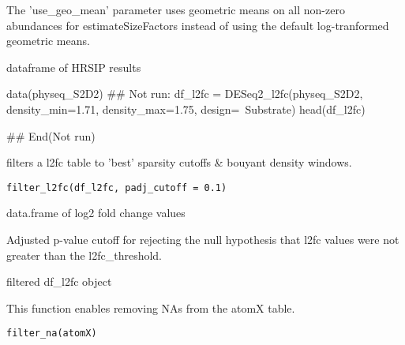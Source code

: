 \documentclass[a4paper]{book}
\begin{document}
%
\begin{Details}\relax
The 'use\_geo\_mean' parameter uses geometric means on all non-zero abundances
for estimateSizeFactors instead of using the default log-tranformed geometric means.
\end{Details}
%
\begin{Value}
dataframe of HRSIP results
\end{Value}
%
\begin{Examples}
\begin{ExampleCode}
data(physeq_S2D2)
## Not run: 
df_l2fc = DESeq2_l2fc(physeq_S2D2, density_min=1.71, density_max=1.75, design=~Substrate)
head(df_l2fc)

## End(Not run)

\end{ExampleCode}
\end{Examples}
%
\begin{Description}\relax
{} filters a l2fc table to 'best' sparsity cutoffs \&
bouyant density windows.
\end{Description}
%
\begin{Usage}
\begin{verbatim}
filter_l2fc(df_l2fc, padj_cutoff = 0.1)
\end{verbatim}
\end{Usage}
%
\begin{Arguments}
\begin{ldescription}
\item[\code{df\_l2fc}] data.frame of log2 fold change values

\item[\code{padj\_cutoff}] Adjusted p-value cutoff for rejecting the null hypothesis
that l2fc values were not greater than the l2fc\_threshold.
\end{ldescription}
\end{Arguments}
%
\begin{Value}
filtered df\_l2fc object
\end{Value}
%
\begin{Description}\relax
This function enables removing NAs from the atomX table.
\end{Description}
%
\begin{Usage}
\begin{verbatim}
filter_na(atomX)
\end{verbatim}
\end{Usage}
\end{document}
